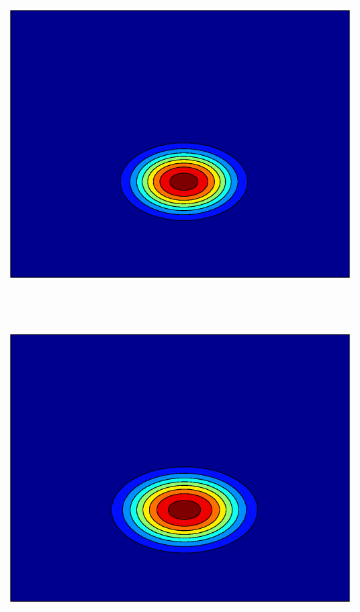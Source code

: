 \documentclass[useAMS,usenatbib,fleqn]{mn2e}
\begin{document}
\begin{figure}
        \centering
        \begin{subfigure}[b]{0.3\columnwidth}
               \includegraphics[width=\textwidth]{figures/GPGL1.eps}
        \end{subfigure}
        ~
         \begin{subfigure}[b]{0.3\columnwidth}
                \includegraphics[width=\textwidth]{figures/GPVL1.eps}
        \end{subfigure}
        ~
        \begin{subfigure}[b]{0.3\columnwidth}

\end{subfigure}
\end{figure}
\end{document}

